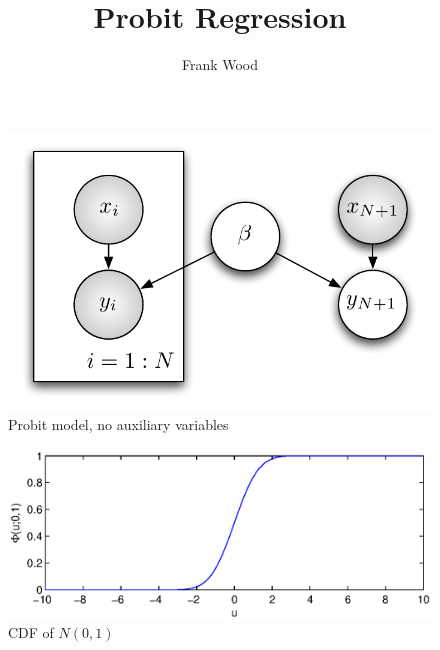 \documentclass[11pt]{amsart}
\title{Probit Regression}
\author{Frank Wood}
\begin{document}
\maketitle

\begin{figure}[htbp]
\begin{center}
\includegraphics{probit_no_aux_vars}
\caption{Probit model, no auxiliary variables}
\label{fig:probit_no_aux_vars}
\end{center}
\end{figure}


\begin{figure}[htbp]
\begin{center}
\includegraphics{cdf.eps}
\caption{CDF of $N(0,1)$}
\label{fig:cdf}
\end{center}
\end{figure}
\end{document}
